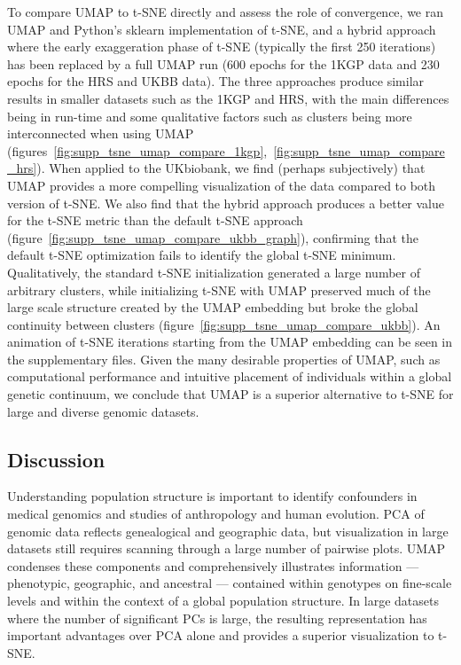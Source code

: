 \documentclass[12pt]{pnas-new}
\begin{document}
To compare UMAP to t-SNE directly and assess the role of convergence, we ran UMAP and Python's sklearn implementation of t-SNE, and a hybrid approach where the early exaggeration phase of t-SNE (typically the first 250 iterations) has been replaced by a full UMAP run (600 epochs for the 1KGP data and 230 epochs for the HRS and UKBB data). The three approaches produce similar results in smaller datasets such as the 1KGP and HRS, with the main differences being in run-time and some qualitative factors such as clusters being more interconnected when using UMAP (figures~\ref{fig:supp_tsne_umap_compare_1kgp},~\ref{fig:supp_tsne_umap_compare_hrs}). When applied to the UKbiobank, we find (perhaps subjectively) that UMAP provides a more compelling visualization of the data compared to both version of t-SNE. We also find that the hybrid approach produces a better value for the t-SNE metric than the default t-SNE approach (figure~\ref{fig:supp_tsne_umap_compare_ukbb_graph}), confirming that the default t-SNE optimization fails to identify the global t-SNE minimum. Qualitatively, the standard t-SNE initialization generated a large number of arbitrary clusters, while initializing t-SNE with UMAP preserved much of the large scale structure created by the UMAP embedding but broke the global continuity between clusters (figure~\ref{fig:supp_tsne_umap_compare_ukbb}). An animation of t-SNE iterations starting from the UMAP embedding can be seen in the supplementary files. Given the many desirable properties of UMAP, such as computational performance and intuitive placement of individuals within a global genetic continuum, we conclude that UMAP is a superior alternative to t-SNE for large and diverse genomic datasets.

\subsection*{Discussion}
Understanding population structure is important to identify confounders in medical genomics and studies of anthropology and human evolution. PCA of genomic data reflects genealogical and geographic data, but visualization in large datasets still requires scanning through a large number of pairwise plots. UMAP condenses these components and comprehensively illustrates information --- phenotypic, geographic, and ancestral --- contained within genotypes on fine-scale levels and within the context of a global population structure. In large datasets where the number of significant PCs is large, the resulting representation has important advantages over PCA alone and provides a superior visualization to t-SNE.
\end{document}
